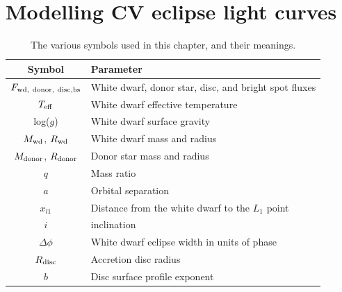 \newpage
\section{Modelling CV eclipse light curves}
\label{sect:modelling:light curve modelling}

\begin{table}
    \centering
    \caption{The various symbols used in this chapter, and their meanings.}
    \label{table:modelling:parameter key}
    \begin{tabular}{cl}
        \hline
        Symbol & Parameter \\
        \hline
        \hline
        $F_{\rm wd,\ donor,\ disc, bs}$                                 & White dwarf, donor star, disc, and bright spot fluxes   \\
        $T_{\rm eff}$                                                   & White dwarf effective temperature \\
        log($g$)                                                        & White dwarf surface gravity \\
        $M_{\rm wd}$, $R_{\rm wd}$                                      & White dwarf mass and radius                             \\
        $M_{\rm donor}$, $R_{\rm donor}$                                & Donor star mass and radius                              \\
        $q$                                                             & Mass ratio                                              \\
        $a$                                                             & Orbital separation                                      \\
        $x_{l1}$                                                        & Distance from the white dwarf to the $L_1$ point        \\
        $i$                                                             & inclination                                             \\
        $\Delta \phi$                                                   & White dwarf eclipse width in units of phase             \\
        $R_{\rm disc}$                                                  & Accretion disc radius                                   \\
        $b$                                                             & Disc surface profile exponent                           \\

\end{tabular}
\end{table}
